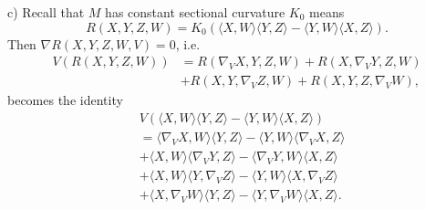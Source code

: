 \begin{itemize}
    c) Recall that $M$ has constant sectional curvature $K_0$ means
    \[R(X,Y,Z,W)=K_0(\langle X,W\rangle\langle Y,Z\rangle
    -\langle Y,W\rangle\langle X,Z\rangle).\]
    Then $\nabla R(X,Y,Z,W,V)=0$, i.e.
    \begin{align*}
        V(R(X,Y,Z,W))&=R(\nabla_VX,Y,Z,W)+R(X,\nabla_VY,Z,W)\\
        &+R(X,Y,\nabla_VZ,W)+R(X,Y,Z,\nabla_VW),
    \end{align*}
    becomes the identity
    \begin{align*}
        &V(\langle X,W\rangle\langle Y,Z\rangle
        -\langle Y,W\rangle\langle X,Z\rangle)\\
        &=\langle \nabla_VX,W\rangle\langle Y,Z\rangle
        -\langle Y,W\rangle\langle \nabla_VX,Z\rangle\\
        &+\langle X,W\rangle\langle \nabla_VY,Z\rangle
        -\langle \nabla_VY,W\rangle\langle X,Z\rangle\\
        &+\langle X,W\rangle\langle Y,\nabla_VZ\rangle
        -\langle Y,W\rangle\langle X,\nabla_VZ\rangle\\
        &+\langle X,\nabla_VW\rangle\langle Y,Z\rangle
        -\langle Y,\nabla_VW\rangle\langle X,Z\rangle.
    \end{align*}


\end{itemize}
